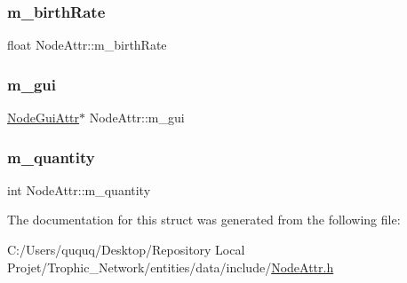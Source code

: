 \subsubsection{\texorpdfstring{m\+\_\+birth\+Rate}{m\_birthRate}}
{\footnotesize\ttfamily float Node\+Attr\+::m\+\_\+birth\+Rate}

\mbox{\label{struct_node_attr_ab879f09d2cedd542d240f529062c495f}} 
\subsubsection{\texorpdfstring{m\+\_\+gui}{m\_gui}}
{\footnotesize\ttfamily \mbox{\hyperlink{struct_node_gui_attr}{Node\+Gui\+Attr}}$\ast$ Node\+Attr\+::m\+\_\+gui}

\mbox{\label{struct_node_attr_a4f41a824fc2c1c549673ee35999b1133}} 
\subsubsection{\texorpdfstring{m\+\_\+quantity}{m\_quantity}}
{\footnotesize\ttfamily int Node\+Attr\+::m\+\_\+quantity}



The documentation for this struct was generated from the following file\+:\begin{DoxyCompactItemize}
\item 
C\+:/\+Users/ququq/\+Desktop/\+Repository Local Projet/\+Trophic\+\_\+\+Network/entities/data/include/\mbox{\hyperlink{_node_attr_8h}{Node\+Attr.\+h}}\end{DoxyCompactItemize}
